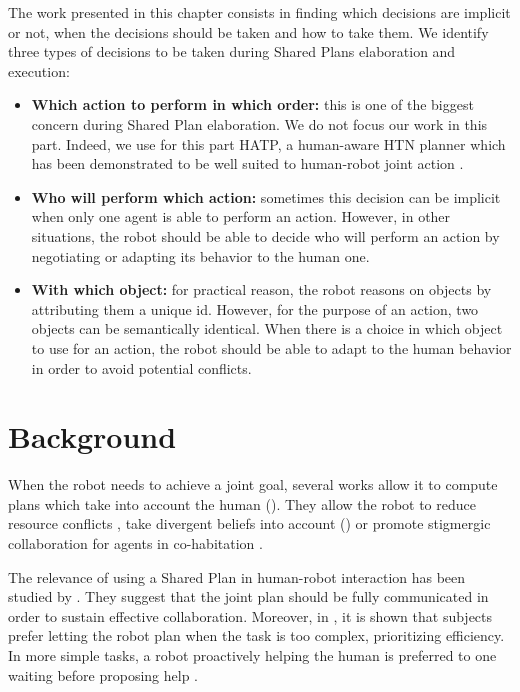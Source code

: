 \documentclass[english,a4paper,11pt,twoside]{StyleThese}
\begin{document}
The work presented in this chapter consists in finding which decisions are implicit or not, when the decisions should be taken and how to take them. We identify three types of decisions to be taken during Shared Plans elaboration and execution:
\begin{itemize}
\item \textbf{Which action to perform in which order:} this is one of the biggest concern during Shared Plan elaboration. We do not focus our work in this part. Indeed, we use for this part HATP, a human-aware HTN planner which has been demonstrated to be well suited to human-robot joint action \cite{Lallement2014hatp}.
\item \textbf{Who will perform which action:} sometimes this decision can be implicit when only one agent is able to perform an action. However, in other situations, the robot should be able to decide who will perform an action by negotiating or adapting its behavior to the human one.
\item \textbf{With which object:} for practical reason, the robot reasons on objects by attributing them a unique id. However, for the purpose of an action, two objects can be semantically identical. When there is a choice in which object to use for an action, the robot should be able to adapt to the human behavior in order to avoid potential conflicts.
\end{itemize}

\section{Background}

When the robot needs to achieve a joint goal, several works allow it to compute plans which take into account the human (\cite{cirillo2010human,Lallement2014hatp}). They allow the robot to reduce resource conflicts \cite{chakraborti2016planning}, take divergent beliefs into account (\cite{guitton2012belief,talamadupula2014coordination}) or promote stigmergic collaboration
for agents in co-habitation \cite{chakraborti2015planning}. 

The relevance of using a Shared Plan in human-robot interaction has been studied by \cite{lallee2013cooperative}. They suggest that the joint plan should be fully communicated in order to sustain effective collaboration. Moreover, in \cite{gombolay2015decision}, it is shown that subjects prefer letting the robot plan when the task is too complex, prioritizing efficiency. 
In more simple tasks, a robot proactively helping the human is preferred to one waiting before proposing help \cite{baraglia2016initiative}. 
\end{document}
